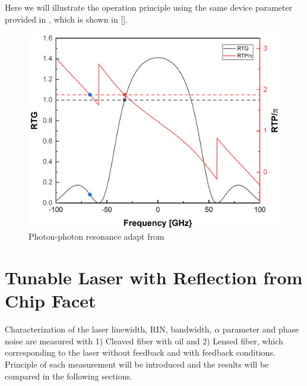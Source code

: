 Here we will illustrate the operation principle using the same device parameter provided in \cite{montrosset2014laser}, which is shown in [].
\begin{figure}[ht]
    \centering
    \includegraphics[width=.7\linewidth]{figures/PP_resonance_operation_principle.png}
    \caption{Photon-photon resonance adapt from \cite{montrosset2014laser}}
    \label{fig:PP_resonance_operation_principle}
\end{figure}


\chapter{Tunable Laser with Reflection from Chip Facet}\label{ch:normal_laser}
Characterization of the laser linewidth, RIN, bandwidth, $\alpha$ parameter and phase noise are measured with 1) Cleaved fiber with oil and 2) Lensed fiber, which corresponding to the laser without feedback and with feedback conditions. Principle of each measurement will be introduced and the results will be compared in the following sections.
